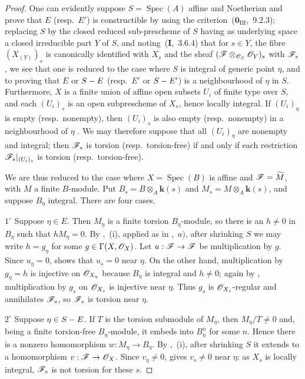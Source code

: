 \begin{proof}
One can evidently suppose $S=\operatorname{Spec}(A)$ affine and Noetherian and prove that $E$ (resp.\ $E'$) is constructible by using the criterion~($\mathbf{0}_{\mathrm{III}}$,~9.2.3); replacing $S$ by the closed reduced sub-prescheme of $S$ having as underlying space a closed irreducible part $Y$ of $S$, and noting~(\textbf{I},~3.6.4) that for $s\in Y$, the fibre $(X_{(Y)})_s$ is canonically identified with $X_s$ and the sheaf $(\mathscr{F}\otimes_{\mathscr{O}_S}\mathscr{O}_Y)_s$ with $\mathscr{F}_s$, we see that one is reduced to the case where $S$ is integral of generic point $\eta$, and to proving that $E$ or $S- E$ (resp.\ $E'$ or $S- E'$) is a neighbourhood of $\eta$ in $S$.
Furthermore, $X$ is a finite union of affine open subsets $U_i$ of finite type over $S$, and each $(U_i)_s$ is an open subprescheme of $X_s$, hence locally integral. If $(U_i)_\eta$ is empty (resp.\ nonempty), then $(U_i)_s$ is also empty (resp.\ nonempty) in a neighbourhood of $\eta$ . We may therefore suppose that all $(U_i)_\eta$ are nonempty and integral; then $\mathscr{F}_s$ is torsion (resp.\ torsion-free) if and only if each restriction $\mathscr{F}_s|_{(U_i)_s}$ is torsion (resp.\ torsion-free).

We are thus reduced to the case where $X=\operatorname{Spec}(B)$ is affine and $\mathscr{F}=\widetilde{M}$, with $M$ a finite $B$-module. Put $B_s=B\otimes_A\boldsymbol{k}(s)$ and $M_s=M\otimes_A\boldsymbol{k}(s)$, and suppose $B_\eta$ integral. There are four cases.

$1^\circ$ Suppose $\eta\in E$. Then $M_\eta$ is a finite torsion $B_\eta$-module, so there is an $h\neq 0$ in $B_\eta$ such that $hM_\eta=0$. By ,~(i), applied as in ,~$a)$,
after shrinking $S$ we may write $h=g_\eta$ for some $g\in\Gamma(X,\mathscr{O}_X)$. Let $u:\mathscr{F}\to\mathscr{F}$ be multiplication by $g$. Since $u_\eta=0$,  shows that $u_s=0$ near $\eta$. On the other hand, multiplication by $g_\eta=h$ is injective on $\mathscr{O}_{X_\eta}$ because $B_\eta$ is integral and $h\neq 0$; again by , multiplication by $g_s$ on $\mathscr{O}_{X_s}$ is injective near $\eta$. Thus $g_s$ is $\mathscr{O}_{X_s}$-regular and annihilates $\mathscr{F}_s$, so $\mathscr{F}_s$ is torsion near $\eta$.

$2^\circ$ Suppose $\eta\in S- E$. If $T$ is the torsion submodule of $M_\eta$, then $M_\eta/T\neq 0$ and, being a finite torsion-free $B_\eta$-module, it embeds into $B_\eta^n$ for some $n$. Hence there is a nonzero homomorphism $w:M_\eta\to B_\eta$. By ,~(i), after shrinking $S$ it extends to a homomorphism $v:\mathscr{F}\to\mathscr{O}_X$. Since $v_\eta\neq 0$,  gives $v_s\neq 0$ near $\eta$; as $X_s$ is locally integral, $\mathscr{F}_s$ is not torsion for these $s$.


\end{proof}
